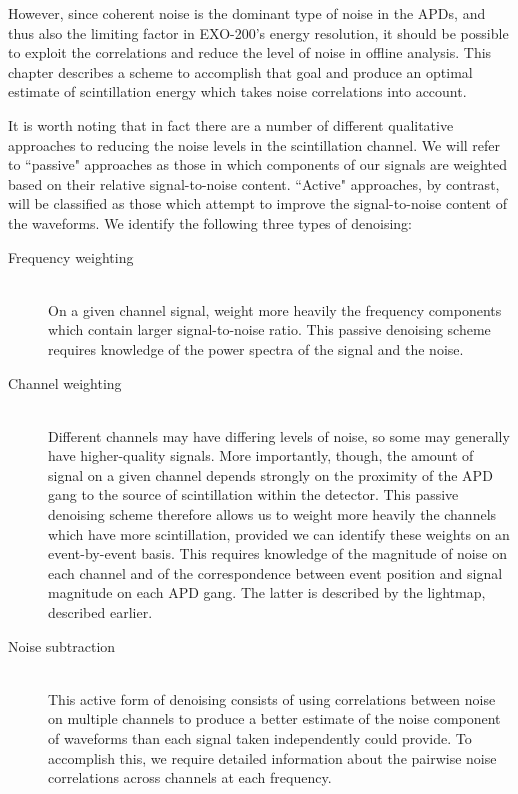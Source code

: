 However, since coherent noise is the dominant type of noise in the APDs, and thus also the limiting factor in EXO-200's energy resolution, it should be possible to exploit the correlations and reduce the level of noise in offline analysis.  This chapter describes a scheme to accomplish that goal and produce an optimal estimate of scintillation energy which takes noise correlations into account.

It is worth noting that in fact there are a number of different qualitative approaches to reducing the noise levels in the scintillation channel.  We will refer to ``passive" approaches as those in which components of our signals are weighted based on their relative signal-to-noise content.  ``Active" approaches, by contrast, will be classified as those which attempt to improve the signal-to-noise content of the waveforms.  We identify the following three types of denoising:
\begin{description}
\item[Frequency weighting] \hfill \\
On a given channel signal, weight more heavily the frequency components which contain larger signal-to-noise ratio.  This passive denoising scheme requires knowledge of the power spectra of the signal and the noise.

\item[Channel weighting] \hfill \\
Different channels may have differing levels of noise, so some may generally have higher-quality signals.  More importantly, though, the amount of signal on a given channel depends strongly on the proximity of the APD gang to the source of scintillation within the detector.  This passive denoising scheme therefore allows us to weight more heavily the channels which have more scintillation, provided we can identify these weights on an event-by-event basis.  This requires knowledge of the magnitude of noise on each channel and of the correspondence between event position and signal magnitude on each APD gang. The latter is described by the lightmap, described earlier.

\item[Noise subtraction] \hfill \\
This active form of denoising consists of using correlations between noise on multiple channels to produce a better estimate of the noise component of waveforms than each signal taken independently could provide.  To accomplish this, we require detailed information about the pairwise noise correlations across channels at each frequency.
\end{description}

